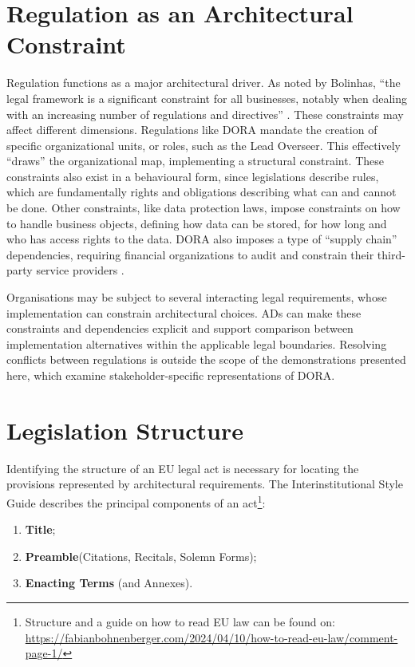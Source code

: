 \section{Regulation as an Architectural Constraint}

Regulation functions as a major architectural driver. As noted by Bolinhas\cite{Pbol}, ``the legal framework is a significant constraint for all businesses, notably when dealing with an increasing number of regulations and directives'' \cite{practiceEnterpriseModelling}. These constraints may affect different dimensions. Regulations like \ac{DORA} mandate the creation of specific organizational units, or roles, such as the Lead Overseer. This effectively ``draws'' the organizational map, implementing a structural constraint. These constraints also exist in a behavioural form, since legislations describe rules, which are fundamentally rights and obligations \cite{Breaux2007} describing what can and cannot be done. Other constraints, like data protection laws, impose constraints on how to handle business objects, defining how data can be stored, for how long and who has access rights to the data. \ac{DORA} also imposes a type of ``supply chain'' dependencies, requiring financial organizations to audit and constrain their third-party service providers \cite{DORA}.

Organisations may be subject to several interacting legal requirements, whose implementation can constrain architectural choices. \ac{AD}s can make these constraints and dependencies explicit and support comparison between implementation alternatives within the applicable legal boundaries. Resolving conflicts between regulations is outside the scope of the demonstrations presented here, which examine stakeholder-specific representations of \ac{DORA}.

\section{Legislation Structure} 
\label{sec:legisStruc}

Identifying the structure of an \ac{EU} legal act is necessary for locating the provisions represented by architectural requirements. The Interinstitutional Style Guide describes the principal components of an act\footnote{\label{ft:howToReadEULaw}Structure and a guide on how to read \ac{EU} law can be found on: \url{https://fabianbohnenberger.com/2024/04/10/how-to-read-eu-law/comment-page-1/}}:\cite{EUStyleGuideLegalActStructure}
\begin{enumerate}
    \item \textbf{Title};
    \item \textbf{Preamble}(Citations, Recitals, Solemn Forms);
    \item \textbf{Enacting Terms} (and Annexes).
\end{enumerate}

